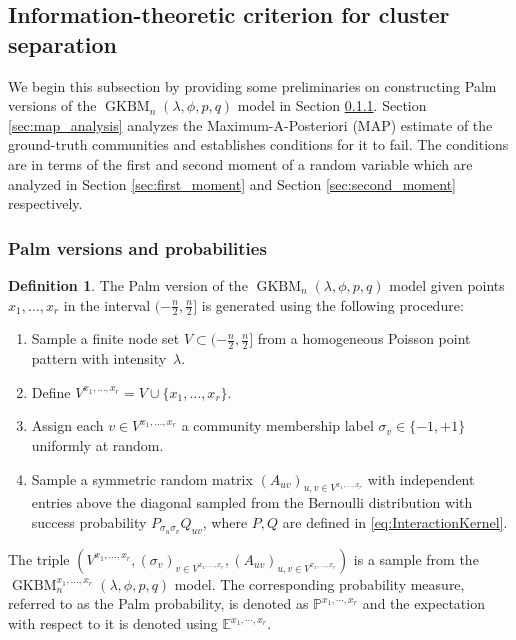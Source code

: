 \documentclass[letterpaper,11pt]{article}
\theoremstyle{definition}
\newtheorem{defn}{Definition}[section]
\def\E{\mathbb{E}}
\def\P{\mathbb{P}}
\def\torus{(-\frac{n}{2}, \frac{n}{2}]}
\numberwithin{equation}{section}
\newcommand{\GKBM}{\operatorname{GKBM}}
\newcommand{\la}{\lambda}
\theoremstyle{definition}
\newtheorem{defn}{Definition}[section]
\def\E{\mathbb{E}}
\def\P{\mathbb{P}}
\def\torus{(-\frac{n}{2}, \frac{n}{2}]}
\numberwithin{equation}{section}
\newcommand{\GKBM}{\operatorname{GKBM}}
\newcommand{\la}{\lambda}
\theoremstyle{thmstyletwo}%
\begin{document}
\subsection{Information-theoretic criterion for cluster separation}
\label{sec:info_metric}
We begin this subsection by providing some preliminaries on constructing Palm versions of the $\GKBM_n(\la,\phi,p,q)$ model in Section \ref{sec:palm}. Section \ref{sec:map_analysis} analyzes the Maximum-A-Posteriori (MAP) estimate of the ground-truth communities and establishes conditions for it to fail. The conditions are in terms of the first and second moment of a random variable which are analyzed in Section \ref{sec:first_moment} and Section \ref{sec:second_moment} respectively.

\subsubsection{Palm versions and probabilities}
\label{sec:palm}

\begin{defn}
The Palm version of the $\GKBM_n(\la,\phi,p,q)$ model given points $x_1,\dots,x_r$ in the interval $\torus$ is generated using the following procedure:
\begin{enumerate}
    \item Sample a finite node set $V \subset \torus$ from a homogeneous Poisson point pattern with intensity~$\la$. 
    \item Define $V^{x_1,\dots,x_r} = V \cup \{x_1,\dots,x_r\}$.
    \item Assign each $v \in V^{x_1,\dots,x_r}$ a community membership label $\sigma_v \in \{-1,+1\}$ uniformly at random.
    \item Sample a symmetric random matrix $(A_{uv})_{u,v \in V^{x_1,\dots,x_r}}$ with independent entries above the diagonal sampled from the Bernoulli distribution with success probability $P_{\sigma_u \sigma_v} Q_{uv}$, where $P,Q$ are defined in \eqref{eq:InteractionKernel}. 
\end{enumerate}
The triple $(V^{x_1,\dots,x_r}, (\sigma_v)_{v \in V^{x_1,\dots,x_r}}, (A_{uv})_{u,v \in V^{x_1,\dots,x_r}})$ is a sample from the $\GKBM_n^{x_1,\dots,x_r}(\la,\phi,p,q)$ model. The corresponding probability measure, referred to as the Palm probability, is denoted as $\P^{x_1,\cdots,x_r}$ and the expectation with respect to it is denoted using $\E^{x_1,\cdots,x_r}$.
\end{defn}
\end{document}
